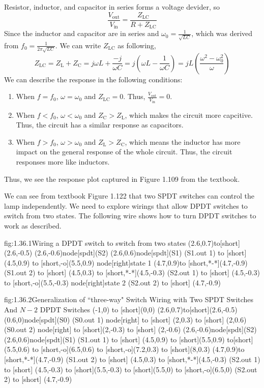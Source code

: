     Resistor, inductor, and capacitor in series forms a voltage devider, so 
    \[\frac{V_\text{out}}{V_\text{in}} = \frac{Z_\text{LC}}{R + Z_\text{LC}}\]
    Since the inductor and capacitor are in series and $\omega_0 = \frac{1}{\sqrt{LC}}$, which was derived from $f_0 = \frac{1}{2\pi \sqrt{LC}}$.
    We can write $Z_\text{LC}$ as following,
    \[Z_\text{LC} = Z_\text{L} + Z_\text{C} = j\omega L + \frac{-j}{\omega C} = j(\omega L - \frac{1}{\omega C})
        = jL(\frac{\omega^2 - \omega_0^2}{\omega})\]
    We can describe the response in the following conditions:
    \begin{enumerate}
        \item 
        When $f=f_0$, $\omega = \omega_0$ and $Z_\text{LC} = 0$. Thus, $\frac{V_\text{out}}{V_\text{in}} = 0$. 
        \item 
        When $f<f_0$, $\omega < \omega_0$ and $Z_\text{C} > Z_\text{L}$, which makes the circuit more capcitive. 
        Thus, the circuit has a similar response as capacitors.
        \item 
        When $f>f_0$, $\omega > \omega_0$ and $Z_\text{L} > Z_\text{C}$, which means the inductor has more impact on the general response of the whole circuit. 
        Thus, the circuit responses more like inductors.
    \end{enumerate}  
    Thus, we see the response plot captured in Figure 1.109 from the textbook.

    We can see from textbook Figure 1.122 that two SPDT switches can control the lamp independently. 
    We need to explore wirings that allow DPDT switches to switch from two states. The following wire shows how to turn DPDT switches to work as described.
\begin{circuit}{fig:1.36.1}{Wiring a DPDT switch to switch from two states}
    (2.6,0.7)to[short](2.6,-0.5)
    (2.6,-0.6)node[spdt](S2){}
    (2.6,0.6)node[spdt](S1){}
    (S1.out 1) to [short] (4.5,0.9)
    to [short,-o](5.5,0.9) node[right]{state 1}
    (4.7,0.9)to [short,*-*](4.7,-0.9)
    (S1.out 2) to [short] (4.5,0.3)
    to [short,*-*](4.5,-0.3)
    (S2.out 1) to [short] (4.5,-0.3)
    to [short,-o](5.5,-0.3) node[right]{state 2}
    (S2.out 2) to [short] (4.7,-0.9)
\end{circuit}

\begin{circuit}{fig:1.36.2}{Generalization of ``three-way" Switch Wiring with Two SPDT Switches And $N-2$ DPDT Switches}
    (-1,0) to [short](0,0) 
    (2.6,0.7)to[short](2.6,-0.5)
    (0.6,0)node[spdt](S0){}
    (S0.out 1) node[right] {}
    to [short] (2,0.3)
    to [short] (2,0.6)
    (S0.out 2) node[right]{}
    to [short](2,-0.3)
    to [short] (2,-0.6)
    (2.6,-0.6)node[spdt](S2){}
    (2.6,0.6)node[spdt](S1){}
    (S1.out 1) to [short] (4.5,0.9)
    to [short](5.5,0.9)
    to[short](5.5,0.6)
    to [short,-o](6.5,0.6)
    to [short,-o](7.2,0.3)
    to [short](8,0.3)
    (4.7,0.9)to [short,*-*](4.7,-0.9)
    (S1.out 2) to [short] (4.5,0.3)
    to [short,*-*](4.5,-0.3)
    (S2.out 1) to [short] (4.5,-0.3)
    to [short](5.5,-0.3)
    to [short](5.5,0)
    to [short,-o](6.5,0)
    (S2.out 2) to [short] (4.7,-0.9)
\end{circuit}

